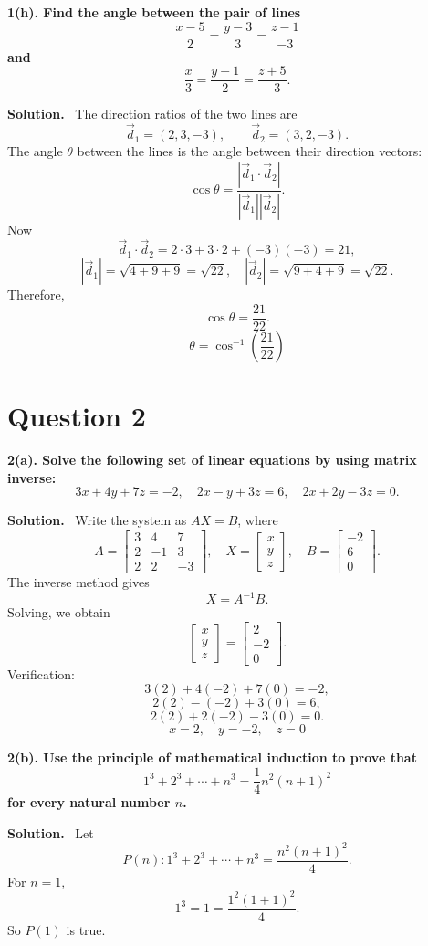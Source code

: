\documentclass[11pt,a4paper]{article}
\newcommand{\question}[1]{\vspace{4pt}\begin{tcolorbox}[colback=softblue,colframe=headblue,boxrule=0.6pt,arc=2pt,left=5pt,right=5pt,top=4pt,bottom=4pt]\textbf{#1}\end{tcolorbox}}
\newcommand{\answer}{\textbf{Solution.}~}
\newcommand{\finalans}[1]{\[\boxed{#1}\]}
\begin{document}
\question{1(h). Find the angle between the pair of lines
\[
\frac{x-5}{2}=\frac{y-3}{3}=\frac{z-1}{-3}
\]
and
\[
\frac{x}{3}=\frac{y-1}{2}=\frac{z+5}{-3}.
\]}
\answer
The direction ratios of the two lines are
\[
\vec d_1=(2,3,-3),\qquad \vec d_2=(3,2,-3).
\]
The angle $\theta$ between the lines is the angle between their direction vectors:
\[
\cos\theta=\frac{|\vec d_1\cdot \vec d_2|}{|\vec d_1||\vec d_2|}.
\]
Now
\[
\vec d_1\cdot \vec d_2=2\cdot3+3\cdot2+(-3)(-3)=21,
\]
\[
|\vec d_1|=\sqrt{4+9+9}=\sqrt{22},
\quad |\vec d_2|=\sqrt{9+4+9}=\sqrt{22}.
\]
Therefore,
\[
\cos\theta=\frac{21}{22}.
\]
\finalans{\theta=\cos^{-1}\left(\frac{21}{22}\right)}

\section*{Question 2}

\question{2(a). Solve the following set of linear equations by using matrix inverse:
\[
3x+4y+7z=-2,
\quad 2x-y+3z=6,
\quad 2x+2y-3z=0.
\]}
\answer
Write the system as $AX=B$, where
\[
A=\begin{bmatrix}3&4&7\\2&-1&3\\2&2&-3\end{bmatrix},
\quad
X=\begin{bmatrix}x\\y\\z\end{bmatrix},
\quad
B=\begin{bmatrix}-2\\6\\0\end{bmatrix}.
\]
The inverse method gives
\[
X=A^{-1}B.
\]
Solving, we obtain
\[
\begin{bmatrix}x\\y\\z\end{bmatrix}
=
\begin{bmatrix}2\\-2\\0\end{bmatrix}.
\]
Verification:
\[
3(2)+4(-2)+7(0)=-2,
\]
\[
2(2)-(-2)+3(0)=6,
\]
\[
2(2)+2(-2)-3(0)=0.
\]
\finalans{x=2,\quad y=-2,\quad z=0}

\question{2(b). Use the principle of mathematical induction to prove that
\[
1^3+2^3+\cdots+n^3=\frac{1}{4}n^2(n+1)^2
\]
for every natural number $n$.}
\answer
Let
\[
P(n):1^3+2^3+\cdots+n^3=\frac{n^2(n+1)^2}{4}.
\]
For $n=1$,
\[
1^3=1=\frac{1^2(1+1)^2}{4}.
\]
So $P(1)$ is true.
\end{document}
